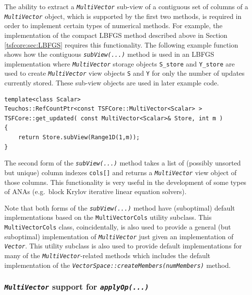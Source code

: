 \noindent The ability to extract a \texttt{\textit{Multi\-Vector}} sub-view of a
contiguous set of columns of a \texttt{\textit{Multi\-Vector}} object,
which is supported by the first two methods, is required in order to
implement certain types of numerical methods.  For example, the
implementation of the compact LBFGS method described above in Section
\ref{tsfcore:sec:LBFGS} requires this functionality.
The following example function shows how the contiguous
\texttt{\textit{subView(...)}} method is used in an LBFGS
implementation where \texttt{\textit{Multi\-Vector}} storage objects
\texttt{S\_store} and \texttt{Y\_store} are used to create
\texttt{\textit{Multi\-Vector}} view objects \texttt{S} and \texttt{Y}
for only the number of updates currently stored.  These sub-view
objects are used in later example code.

{\scriptsize\begin{verbatim}
template<class Scalar>
Teuchos::RefCountPtr<const TSFCore::MultiVector<Scalar> >
TSFCore::get_updated( const MultiVector<Scalar>& Store, int m )
{
    return Store.subView(Range1D(1,m));
}
\end{verbatim}}

The second form of the \texttt{\textit{subView(...)}} method takes a
list of (possibly unsorted but unique) column indexes \texttt{cols[]}
and returns a \texttt{\textit{Multi\-Vector}} view object of those
columns.  This functionality is very useful in the development of some
types of ANAs (e.g.~block Krylov iterative linear equation solvers).

Note that both forms of the \texttt{\textit{subView(...)}} method have
(suboptimal) default implementations based on the
\texttt{MultiVectorCols} utility subclass.  This
\texttt{MultiVectorCols} class, coincidentally, is also used
to provide a general (but suboptimal) implementation of
\texttt{\textit{Multi\-Vector}} just given an implementation of
\texttt{\textit{Vector}}.  This utility subclass is also used to
provide default implementations for many of the
\texttt{\textit{Multi\-Vector}}-related methods which includes
the default implementation of the
\texttt{\textit{VectorSpace\-::createMembers(numMembers)}} method.

%
\subsubsection{\texttt{\textit{Multi\-Vector}} support for \texttt{\textit{applyOp(\-...)}}}
\label{tsfcore:sec:multi_vec_apply_op}
%

